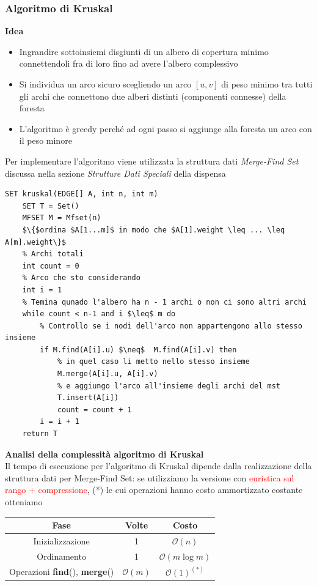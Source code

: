 \documentclass[../cheatSheetAlgoritmi.tex]{subfiles}
\begin{document}
\subsubsection{Algoritmo di Kruskal}
\textbf{Idea}
\begin{itemize}
	\item Ingrandire sottoinsiemi disgiunti di un albero di copertura minimo connettendoli fra di loro fino ad avere l’albero complessivo
	\item Si individua un arco sicuro scegliendo un arco $[u, v]$ di peso minimo tra tutti gli archi che connettono due alberi distinti (componenti connesse) della foresta
	\item L’algoritmo è greedy perché ad ogni passo si aggiunge alla foresta un arco con il peso minore
\end{itemize}
Per implementare l'algoritmo viene utilizzata la struttura dati \emph{Merge-Find Set} discussa nella sezione \emph{Strutture Dati Speciali} della dispensa
\begin{lstlisting}[caption=Albero di Copertura di Peso Minimo - Kruskal]
SET kruskal(EDGE[] A, int n, int m)
	SET T = Set()
	MFSET M = Mfset(n)
	$\{$ordina $A[1...m]$ in modo che $A[1].weight \leq ... \leq A[m].weight\}$
	% Archi totali
	int count = 0
	% Arco che sto considerando
	int i = 1
	% Temina qunado l'albero ha n - 1 archi o non ci sono altri archi
	while count < n-1 and i $\leq$ m do
		% Controllo se i nodi dell'arco non appartengono allo stesso insieme
		if M.find(A[i].u) $\neq$  M.find(A[i].v) then
			% in quel caso li metto nello stesso insieme
			M.merge(A[i].u, A[i].v)
			% e aggiungo l'arco all'insieme degli archi del mst
			T.insert(A[i])
			count = count + 1
		i = i + 1
	return T
\end{lstlisting}
\textbf{Analisi della complessità algoritmo di Kruskal}\\
Il tempo di esecuzione per l'algoritmo di Kruskal dipende dalla realizzazione della struttura dati per Merge-Find Set: se utilizziamo la versione con \textcolor{red}{euristica sul rango + compressione}, (*) le cui operazioni hanno costo ammortizzato costante otteniamo
\begin{center}
	\renewcommand{\arraystretch}{1.2}
	\begin{tabular}{ |c|c|c| } 
		\hline
			\textbf{Fase} & \textbf{Volte} & \textbf{Costo}\\ 
		\hline
			Inizializzazione & 1 &  $\mathcal{O}(n)$\\ 
		\hline
			Ordinamento & 1 &  $\mathcal{O}(m \log m)$ \\
		\hline
			Operazioni \textbf{find}(), \textbf{merge}() & $\mathcal{O}(m)$ & $\mathcal{O}(1)^{(*)}$\\
		\hline
	\end{tabular}
\end{center}
\end{document}
